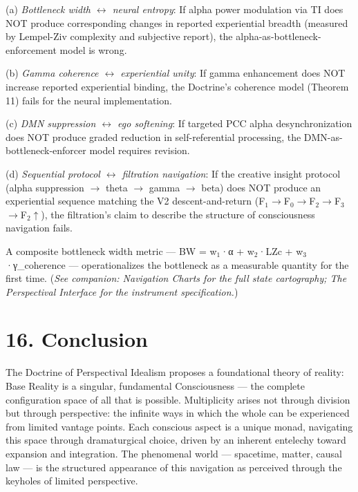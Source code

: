 (a) \textit{Bottleneck width $\leftrightarrow$ neural entropy}: If alpha power modulation via TI does NOT produce corresponding changes in reported experiential breadth (measured by Lempel-Ziv complexity and subjective report), the alpha-as-bottleneck-enforcement model is wrong.


(b) \textit{Gamma coherence $\leftrightarrow$ experiential unity}: If gamma enhancement does NOT increase reported experiential binding, the Doctrine's coherence model (Theorem 11) fails for the neural implementation.


(c) \textit{DMN suppression $\leftrightarrow$ ego softening}: If targeted PCC alpha desynchronization does NOT produce graded reduction in self-referential processing, the DMN-as-bottleneck-enforcer model requires revision.


(d) \textit{Sequential protocol $\leftrightarrow$ filtration navigation}: If the creative insight protocol (alpha suppression $\rightarrow$ theta $\rightarrow$ gamma $\rightarrow$ beta) does NOT produce an experiential sequence matching the V2 descent-and-return (F$_1$$\rightarrow$F$_0$$\rightarrow$F$_2$$\rightarrow$F$_3$$\rightarrow$F$_2$$\uparrow$), the filtration's claim to describe the structure of consciousness navigation fails.


A composite bottleneck width metric — BW = w$_1$·α + w$_2$·LZc + w$_3$·γ\_coherence — operationalizes the bottleneck as a measurable quantity for the first time. (\textit{See companion: Navigation Charts for the full state cartography; The Perspectival Interface for the instrument specification.})


\bigskip\noindent\makebox[\textwidth]{\color{rulegray}\rule{5cm}{0.3pt}}\bigskip


\section*{16. Conclusion}


The Doctrine of Perspectival Idealism proposes a foundational theory of reality: Base Reality is a singular, fundamental Consciousness — the complete configuration space of all that is possible. Multiplicity arises not through division but through perspective: the infinite ways in which the whole can be experienced from limited vantage points. Each conscious aspect is a unique monad, navigating this space through dramaturgical choice, driven by an inherent entelechy toward expansion and integration. The phenomenal world — spacetime, matter, causal law — is the structured appearance of this navigation as perceived through the keyholes of limited perspective.


